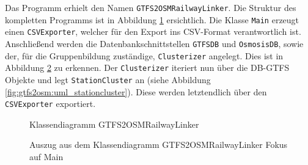 Das Programm erhielt den Namen \texttt{GTFS2OSMRailwayLinker}. 
Die Struktur des kompletten Programms ist in Abbildung \ref{fig:gtfs2osm:uml_full} ersichtlich.
Die Klasse \texttt{Main} erzeugt einen \texttt{CSVExporter}, welcher für den Export ins CSV-Format verantwortlich ist.
Anschließend werden die Datenbankschnittstellen \texttt{GTFSDB} und \texttt{OsmosisDB}, sowie der, für die Gruppenbildung zuständige, \texttt{Clusterizer} angelegt.
Dies ist in Abbildung \ref{fig:gtfs2osm:uml_main} zu erkennen.
Der \texttt{Clusterizer} iteriert nun über die DB-GTFS Objekte und legt \texttt{StationCluster} an (siehe Abbildung \ref{fig:gtfs2osm:uml_stationcluster}).
Diese werden letztendlich über den \texttt{CSVExporter} exportiert.

\begin{figure}[htb]
   \centering
   \caption{Klassendiagramm GTFS2OSMRailwayLinker}
   \label{fig:gtfs2osm:uml_full}
 \end{figure}

\begin{figure}[htb]
   \centering
   \caption{Auszug aus dem Klassendiagramm GTFS2OSMRailwayLinker Fokus auf Main}
   \label{fig:gtfs2osm:uml_main}
 \end{figure}


